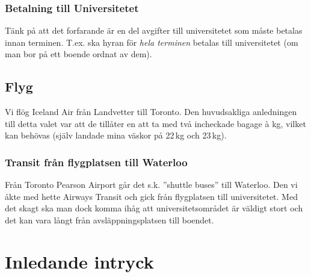 \documentclass[11pt,a4paper, english, swedish]{article}
\begin{document}

\subsubsection{Betalning till Universitetet}
Tänk på att det forfarande är en del avgifter till universitetet som
måste betalas innan terminen. T.ex. ska hyran för \emph{hela terminen}
betalas till universitetet (om man bor på ett boende ordnat av dem). 


\subsection{Flyg}
Vi flög Iceland Air från Landvetter till Toronto. Den huvudsakliga
anledningen till detta valet var att de tillåter en att ta med två
incheckade bagage à \unit[23]{kg}, vilket kan behövas (själv landade
mina väskor på 22\,kg och 23\,kg).

\subsubsection{Transit från flygplatsen till Waterloo}
Från Toronto Pearson Airport går det s.k. ''shuttle buses'' till
Waterloo. Den vi åkte med hette Airways Transit och gick från
flygplatsen till universitetet. Med det skagt ska man dock komma ihåg
att universitetsområdet är väldigt stort och det kan vara långt från
avsläppningsplatsen till boendet. 

\section{Inledande intryck}
\end{document}
